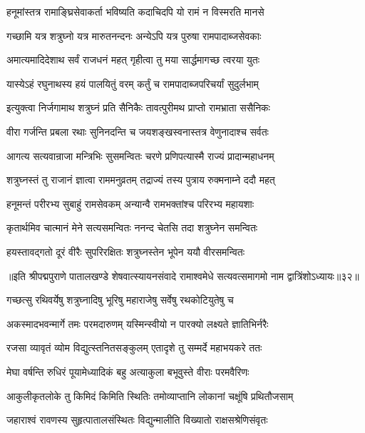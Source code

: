 \twolineshloka
{हनूमांस्तत्र रामाङ्घ्रिसेवाकर्ता भविष्यति}
{कदाचिदपि यो रामं न विस्मरति मानसे}%

\twolineshloka
{गच्छामि यत्र शत्रुघ्नो यत्र मारुतनन्दनः}
{अन्येऽपि यत्र पुरुषा रामपादाब्जसेवकाः}%

\twolineshloka
{अमात्यमादिदेशाथ सर्वं राजधनं महत्}
{गृहीत्वा तु मया सार्द्धमागच्छ त्वरया युतः}%

\twolineshloka
{यास्येऽहं रघुनाथस्य हयं पालयितुं वरम्}
{कर्तुं च रामपादाब्जपरिचर्यां सुदुर्लभाम्}%

\twolineshloka
{इत्युक्त्वा निर्जगामाथ शत्रुघ्नं प्रति सैनिकैः}
{तावत्पुरीमथ प्राप्तो रामभ्राता ससैनिकः}%

\twolineshloka
{वीरा गर्जन्ति प्रबला रथाः सुनिनदन्ति च}
{जयशङ्खस्वनास्तत्र वेणुनादाश्च सर्वतः}%

\twolineshloka
{आगत्य सत्यवान्राजा मन्त्रिभिः सुसमन्वितः}
{चरणे प्रणिपत्यास्मै राज्यं प्रादान्महाधनम्}%

\twolineshloka
{शत्रुघ्नस्तं तु राजानं ज्ञात्वा राममनुव्रतम्}
{तद्राज्यं तस्य पुत्राय रुक्मनाम्ने ददौ महत्}%

\twolineshloka
{हनूमन्तं परीरभ्य सुबाहुं रामसेवकम्}
{अन्यान्वै रामभक्तांश्च परिरभ्य महायशाः}%

\twolineshloka
{कृतार्थमिव चात्मानं मेने सत्यसमन्वितः}
{ननन्द चेतसि तदा शत्रुघ्नेन समन्वितः}%

\twolineshloka
{हयस्तावद्गतो दूरं वीरैः सुपरिरक्षितः}
{शत्रुघ्नस्तेन भूपेन ययौ वीरसमन्वितः}%

॥इति श्रीपद्मपुराणे पातालखण्डे शेषवात्स्यायनसंवादे रामाश्वमेधे सत्यवत्समागमो नाम द्वात्रिंशोऽध्यायः॥३२॥



\twolineshloka
{गच्छत्सु रथिवर्येषु शत्रुघ्नादिषु भूरिषु}
{महाराजेषु सर्वेषु रथकोटियुतेषु च}%

\twolineshloka
{अकस्मादभवन्मार्गे तमः परमदारुणम्}
{यस्मिन्स्वीयो न पारक्यो लक्ष्यते ज्ञातिभिर्नरैः}%

\twolineshloka
{रजसा व्यावृतं व्योम विद्युत्स्तनितसङ्कुलम्}
{एतादृशे तु सम्मर्दे महाभयकरे ततः}%

\twolineshloka
{मेघा वर्षन्ति रुधिरं पूयामेध्यादिकं बहु}
{अत्याकुला बभूवुस्ते वीराः परमवैरिणः}%

\twolineshloka
{आकुलीकृतलोके तु किमिदं किमिति स्थितिः}
{तमोव्याप्तानि लोकानां चक्षूंषि प्रथितौजसाम्}%

\twolineshloka
{जहाराश्वं रावणस्य सुहृत्पातालसंस्थितः}
{विद्युन्मालीति विख्यातो राक्षसश्रेणिसंवृतः}%

